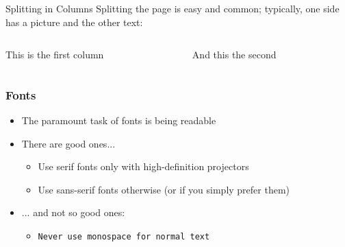 \documentclass[10pt,aspectratio=169]{beamer}
\begin{document}
\begin{frame}[fragile]{Splitting in Columns}
Splitting the page is easy and common;
typically, one side has a picture and the other text:
\begin{columns}
\begin{column}{0.6\textwidth}
This is the first column
\end{column}
\begin{column}{0.3\textwidth}
And this the second
\end{column}
\end{columns}
\end{frame}

\begin{frame}[fragile]
\frametitle{Fonts}
\begin{itemize}
\item The paramount task of fonts is being readable
\item There are good ones...
  \begin{itemize}
  \item {\textrm{Use serif fonts only with high-definition projectors}}
  \item {\textsf{Use sans-serif fonts otherwise (or if you simply prefer them)}}
  \end{itemize}
\item ... and not so good ones:
  \begin{itemize}
  \item {\texttt{Never use monospace for normal text}}
\end{itemize}
\end{itemize}
\end{frame}
\end{document}
